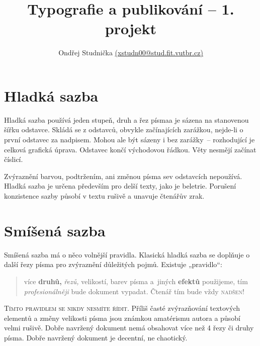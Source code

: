 \documentclass[a4paper,10pt,twocolumn]{article}
\begin{document}
\title{Typografie a publikování -- 1. projekt\vspace{+0.2cm}}

\author{Ondřej Studnička \href{mailto:xstudn00@stud.fit.vutbr.cz}{(xstudn00@stud.fit.vutbr.cz)}}
\date{}
\maketitle


\section{Hladká sazba}
Hladká sazba používá jeden stupeň, druh a řez písma\linebreak a je sázena na stanovenou šířku odstavce. Skládá se z odstavců, obvykle začínajících zarážkou, nejde-li o první odstavec za nadpisem. Mohou ale být sázeny i bez zarážky~-- rozhodující je celková grafická úprava. Odstavec končí východovou řádkou. Věty nesmějí začínat číslicí.

Zvýraznění barvou, podtržením, ani změnou písma se\linebreak v odstavcích nepoužívá. Hladká sazba je určena především pro delší texty, jako je beletrie. Porušení konzistence sazby působí v textu rušivě a unavuje čtenářův zrak.

\section{Smíšená sazba}
\label{sec:smisena}

\vspace{+0.1cm}Smíšená sazba má o něco volnější pravidla. Klasická hladká sazba se doplňuje o další řezy písma pro zvýraznění důležitých pojmů. Existuje „pravidlo“:

\begin{quotation}

 více \textbf{druhů,} \emph{řezů,} {\small velikostí,} barev písma \textsf{a~jiných {\textbf{\tiny {efektů}}}} použijeme, tím \emph{profesionálněji} bude dokument vypadat. Čtenář tím {\large bude }{\LARGE vždy }{\textsc{\Huge nadšen!}}

\end{quotation}

{\scshape Tímto pravidlem se nikdy nesmíte řídit.} Příliš časté zvýrazňování textových elementů a změny velikosti písma jsou známkou amatérismu autora a působí velmi rušivě. Dobře navržený dokument nemá obsahovat více než
4 řezy či druhy písma. Dobře navržený dokument je decentní, ne chaotický.
\end{document}
